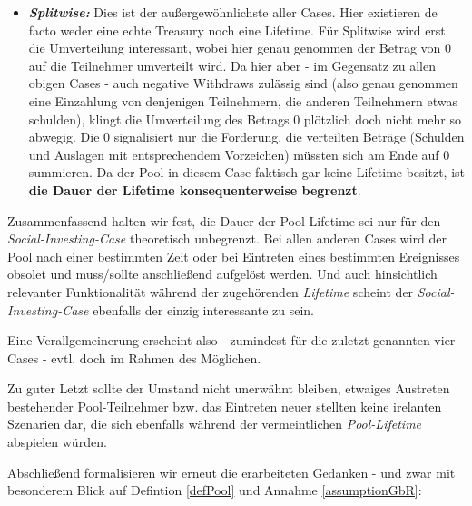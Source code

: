 \begin{itemize}
  \item \textbf{\textit{Splitwise:}} Dies ist der außergewöhnlichste aller Cases. Hier existieren de facto weder eine echte Treasury noch eine Lifetime. Für Splitwise wird erst die Umverteil\-ung interessant, wobei hier genau genommen der Betrag von 0 auf die Teilnehmer umverteilt wird. Da hier aber - im Gegensatz zu allen obigen Cases - auch negative Withdraws zulässig sind (also genau genommen eine Einzahlung von denjenigen Teilnehmern, die anderen Teilnehmern etwas schulden), klingt die Umverteilung des Betrags 0 plötzlich doch nicht mehr so abwegig. Die 0 signalisiert nur die Forderung, die verteilten Beträge (Schulden und Auslagen mit entsprechendem Vorzeichen) müssten sich am Ende auf 0 summieren. Da der Pool in diesem Case faktisch gar keine Lifetime besitzt, ist \textbf{die Dauer der Lifetime konsequenterweise begrenzt}.
\end{itemize}

\vspace{0.3cm}

Zusammenfassend halten wir fest, die Dauer der Pool-Lifetime sei nur für den \textit{Social-Investing-Case} theoretisch unbegrenzt. Bei allen anderen Cases wird der Pool nach einer bestimmten Zeit oder bei Eintreten eines bestimmten Ereignisses obsolet und muss/sollte anschließend aufgelöst werden. Und auch hinsichtlich relevanter Funktionalität während der zugehörenden \textit{Lifetime} scheint der \textit{Social-Investing-Case} ebenfalls der einzig interessante zu sein. 

\vspace{0.1cm}

Eine Verallgemeinerung erscheint also - zumindest für die zuletzt genannten vier Cases - evtl. doch im Rahmen des Möglichen. 

\vspace{0.3cm}

Zu guter Letzt sollte der Umstand nicht unerwähnt bleiben, etwaiges Austreten be\-stehender Pool-Teilnehmer bzw. das Eintreten neuer stellten keine irelanten Szenarien dar, die sich ebenfalls während der vermeintlichen \textit{Pool-Lifetime} abspielen würden.

\vspace{0.3cm}

Abschließend formalisieren wir erneut die erarbeiteten Gedanken - und zwar mit besonderem Blick auf Defintion \ref{defPool} und Annahme \ref{assumptionGbR}: 

\vspace{0.2cm}

